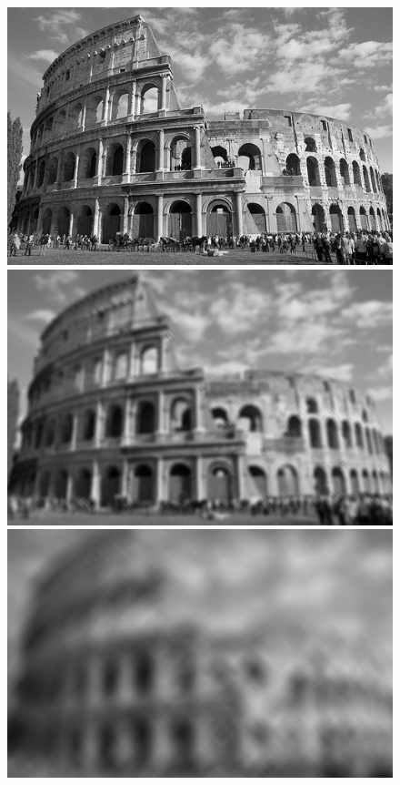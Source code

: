 \documentclass[10pt]{myarticle}
\begin{document}
\begin{figure}[tbh]
	\centering
	\includegraphics[width=\columnwidth]{images/result-example-1.png}
	\includegraphics[width=\columnwidth]{images/result-example-9.png}
	\\
	\includegraphics[width=\columnwidth]{images/result-example-35.png}

\end{figure}
\end{document}
